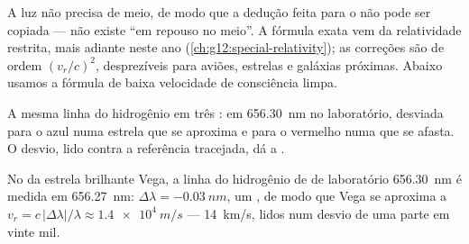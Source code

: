 \begin{remark}\label{rem:g12:doppler-effect:honest}
A luz não precisa de meio, de modo que a dedução feita para o  não
pode ser copiada --- não existe ``em repouso no meio''. A fórmula exata
vem da relatividade restrita, mais adiante neste ano
(\cref{ch:g12:special-relativity}); as correções são de ordem
$(v_r/c)^2$, desprezíveis para aviões, estrelas e galáxias próximas.
Abaixo usamos a fórmula de baixa velocidade de consciência limpa.
\end{remark}

\begin{omfigure}

{\small A mesma linha do hidrogênio em três : em
\qty{656.30}{nm} no laboratório, desviada para o azul numa estrela que se
aproxima e para o vermelho numa que se afasta. O desvio, lido contra a
referência tracejada, dá a .}
\end{omfigure}

\begin{example}\label{ex:g12:doppler-effect:vega}
No  da estrela brilhante Vega, a linha do hidrogênio de
 de laboratório \qty{656.30}{nm} é medida em
\qty{656.27}{nm}: $\Delta\lambda = \qty{-0.03}{nm}$, um , de modo que Vega se aproxima a
$v_r = c\,|\Delta\lambda|/\lambda \approx \qty{1.4e4}{m/s}$ ---
\qty{14}{km/s}, lidos num desvio de uma parte em vinte mil.
\end{example}

